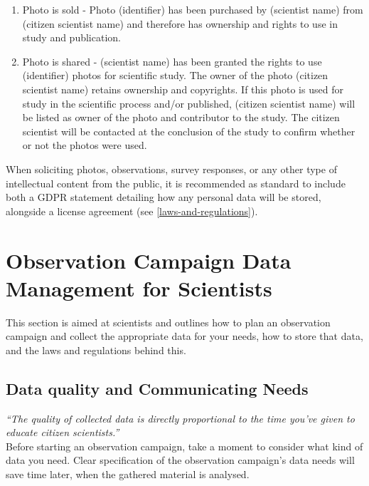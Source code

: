 \documentclass{article}
\newcommand{\contributed}[1]{%
    \par\noindent
    \begingroup
    \setlength{\leftskip}{1em}%
    \itshape
    Contributors: #1
    \par
    \endgroup
    \vspace{0.5em}
}
\begin{document}
\begin{enumerate}
    \item Photo is sold - 
Photo (identifier) has been purchased by (scientist name) from (citizen scientist name) and therefore has ownership and rights to use in study and publication.
\item Photo is shared - (scientist name) has been granted the rights to use (identifier) photos for scientific study.  The owner of the photo (citizen scientist name) retains ownership and copyrights.  If this photo is used for study in the scientific process and/or published, (citizen scientist name) will be listed as owner of the photo and contributor to the study. The citizen scientist will be contacted at the conclusion of the study to confirm whether or not the photos were used.
\end{enumerate}

When soliciting photos, observations, survey responses, or any other type of intellectual content from the public, it is recommended as standard to include both a GDPR statement detailing how any personal data will be stored, alongside a license agreement (see \ref{laws-and-regulations}).





\section{Observation Campaign Data Management for Scientists}\label{sec:data_sci}
This section is aimed at scientists and outlines how to plan an observation campaign and collect the appropriate data for your needs, how to store that data, and the laws and regulations behind this.

\subsection{Data quality and Communicating Needs}\label{sec:data_quality}

\textit{``The quality of collected data is directly proportional to the time you've given to educate citizen scientists.''}\\

Before starting an observation campaign, take a moment to consider what kind of data you need. Clear specification of the observation campaign's data needs will save time later, when the gathered material is analysed. 
\end{document}
